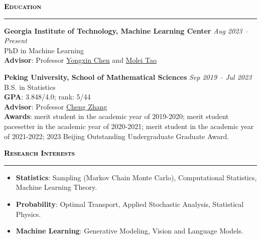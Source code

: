 \documentclass{resume} %
\renewenvironment{rSection}[1]{
\sectionskip
\textcolor{black}{\textbf{\textsc{#1}}}
\sectionlineskip
\hrule
\begin{list}{}{
\setlength{\leftmargin}{1.5em}
}
\item[]
}{
\end{list}
}
\begin{document}
\begin{rSection}{Education}
{\bf Georgia Institute of Technology, Machine Learning Center} \hfill {\em Aug 2023 -- Present} 
\\ PhD in Machine Learning\hfill
\\ \textbf{Advisor}: Professor \href{https://yongxin.ae.gatech.edu/}{Yongxin Chen} and \href{https://mtao8.math.gatech.edu/index.html}{Molei Tao}

{\bf Peking University, School of Mathematical Sciences} \hfill {\em Sep 2019 -- Jul 2023} 
\\ B.S. in Statistics
\\ \textbf{GPA}: 3.848/4.0; rank: 5/44 \hfill
\\ \textbf{Advisor}: Professor \href{https://zcrabbit.github.io/}{Cheng Zhang} 
\\ \textbf{Awards}: merit student in the academic year of 2019-2020; merit student pacesetter in the academic year of 2020-2021; merit student in the academic year of 2021-2022; 2023 Beijing Outstanding Undergraduate Graduate Award.
\end{rSection}

\begin{rSection}{Research Interests}
    \begin{itemize}
        \item \textbf{Statistics}: Sampling (Markov Chain Monte Carlo), Computational Statistics, Machine Learning Theory.
        \item \textbf{Probability}: Optimal Transport, Applied Stochastic Analysis, Statistical Physics.
        \item \textbf{Machine Learning}: Generative Modeling, Vision and Language Models.
    \end{itemize}
\end{rSection}


\end{document}
